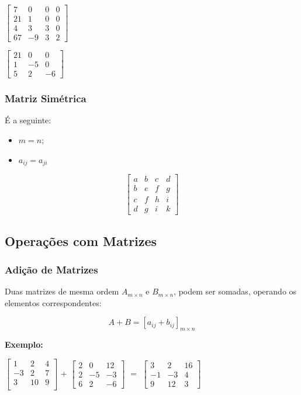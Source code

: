 \documentclass[oneside,a4paper,12pt]{article}
\begin{document}
\begin{multicols}{2}
	$
	\left[
	\begin{array}{cccc}
	7	&	0	&	0	&	0	\\
	21	&	1	&	0	&	0	\\
	4	&	3	&	3	&	0	\\
	67	&	-9	&	3	&	2
	\end{array}
	\right]
	$
	
	$
	\left[
	\begin{array}{ccc}
	21	&	0	&	0	\\
	1	&	-5	&	0	\\
	5	&	2	&	-6
	\end{array}
	\right]
	$
	
\end{multicols}


\subsubsection{Matriz Simétrica}

É a seguinte:
\begin{itemize}
	\item $m=n$;
	\item $a_{ij}=a_{ji}$
\end{itemize}

$$
\left[
\begin{array}{cccc}
a	&	b	&	c	&	d	\\
b	&	e	&	f	&	g	\\
c	&	f	&	h	&	i	\\
d	&	g	&	i	&	k
\end{array}
\right]
$$


\subsection{Operações com Matrizes}

\subsubsection{Adição de Matrizes}
Duas matrizes de mesma ordem $A_{m \times n}$ e $B_{m \times n}$, podem ser somadas, operando os elementos correspondentes:

$$A + B = [a_{ij} + b_{ij}]_{m \times n}$$

\textbf{Exemplo: }


	$
	\left[
	\begin{array}{ccc}
	1	&	2	&	4	\\
	-3	&	2	&	7	\\
	3	&	10	&	9	\\
	\end{array}
	\right]
	$
	$+$
	$
	\left[
	\begin{array}{ccc}
	2	&	0	&	12	\\
	2	&	-5	&	-3	\\
	6	&	2	&	-6
	\end{array}
	\right]
	$
	$=$
	$
	\left[
	\begin{array}{ccc}
	3	&	2	&	16	\\
	-1	&	-3	&	4	\\
	9	&	12	&	3
	\end{array}
	\right]
	$	
	
\end{document}
